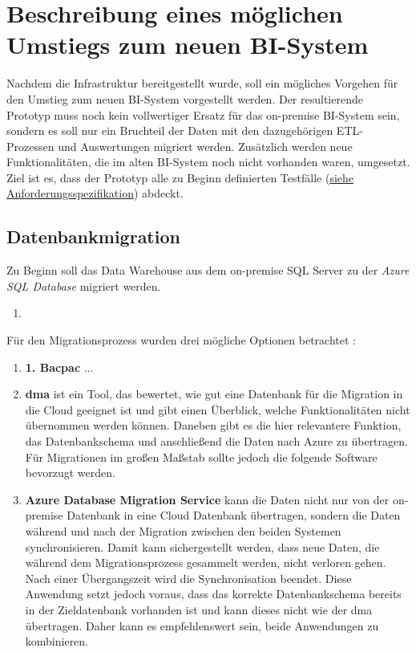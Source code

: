 \section{Beschreibung eines möglichen Umstiegs zum neuen BI-System} \label{sec:praktischeUmsetzung:Migration}
Nachdem die Infrastruktur bereitgestellt wurde, soll ein mögliches Vorgehen für den Umstieg zum neuen BI-System vorgestellt werden. Der resultierende Prototyp muss noch kein vollwertiger Ersatz für das on-premise BI-System sein, sondern es soll nur ein Bruchteil der Daten mit den dazugehörigen ETL-Prozessen und Auswertungen migriert werden. Zusätzlich werden neue Funktionalitäten, die im alten BI-System noch nicht vorhanden waren, umgesetzt. Ziel ist es, dass der Prototyp alle zu Beginn definierten Testfälle (\hyperref[sec:anforderungsspezifikation:funktionaleAnforderungen]{siehe Anforderungsspezifikation}) abdeckt.

\subsection{Datenbankmigration} \label{subsec:praktischeUmsetzung:Datenmigration}
Zu Beginn soll das Data Warehouse aus dem on-premise SQL Server zu der \textit{Azure SQL Database} migriert werden. 


\begin{enumerate}
\item 
\end{enumerate}

Für den Migrationsprozess wurden drei mögliche Optionen betrachtet \cite{soh_microsoft_2020}: 
\begin{enumerate}
\item \textbf{1. Bacpac} ...
\item \textbf{\ac{dma}} ist ein Tool, das bewertet, wie gut eine Datenbank für die Migration in die Cloud geeignet ist und gibt einen Überblick, welche Funktionalitäten nicht übernommen werden können. Daneben gibt es die hier relevantere Funktion, das Datenbankschema und anschließend die Daten nach Azure zu übertragen. Für Migrationen im großen Maßstab sollte jedoch die folgende Software bevorzugt werden. 
\item \textbf{Azure Database Migration Service} kann die Daten nicht nur von der on-premise Datenbank in eine Cloud Datenbank übertragen, sondern die Daten während und nach der Migration zwischen den beiden Systemen synchronisieren. Damit kann sichergestellt werden, dass neue Daten, die während dem Migrationsprozess gesammelt werden, nicht verloren gehen. Nach einer Übergangszeit wird die Synchronisation beendet. Diese Anwendung setzt jedoch voraus, dass das korrekte Datenbankschema bereits in der Zieldatenbank vorhanden ist und kann dieses nicht wie der \ac{dma} übertragen. Daher kann es empfehlenswert sein, beide Anwendungen zu kombinieren.
\end{enumerate}

